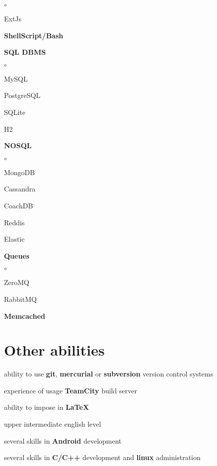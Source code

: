 \documentclass[9pt, a4paper, english]{extarticle}
\begin{document}
\begin{multicols}{3}
\begin {list}{\textbullet}{\itemsep=0mm}
\begin {list}{$\circ$}{}
          \item ExtJs
        \end{list}
      \item \textbf{ShellScript/Bash}
      \columnbreak
      \item \textbf{SQL DBMS}
        \begin {list}{$\circ$}{}
          \item MySQL
          \item PostgreSQL
          \item SQLite
          \item H2
        \end{list}
      \item \textbf{NOSQL}
        \begin {list}{$\circ$}{}
          \item MongoDB
          \item Cassandra
          \item CoachDB
          \item Reddis
          \item Elastic
        \end{list}
      \item \textbf{Queues}
        \begin {list}{$\circ$}{}
          \item ZeroMQ
          \item RabbitMQ
        \end{list}
      \item \textbf{Memcached}
    \end{list}
  \end{multicols}


\section* {Other abilities}
\begin {list}{\textbullet}{\itemsep=0mm}
\item ability to use \textbf{git}, \textbf{mercurial} or \textbf{subversion} version control systems
\item experience of usage \textbf{TeamCity} build server
\item ability to impose in \textbf{LaTeX}
\item upper intermediate english level
\item several skills in \textbf{Android} development
\item several skills in \textbf{C/C++} development and \textbf{linux} administration
\end {list}
\end{document}
